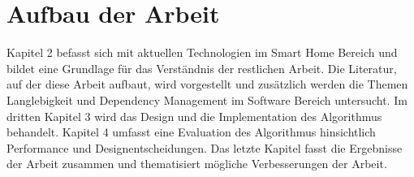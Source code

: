 \section{Aufbau der Arbeit}

Kapitel 2 befasst sich mit aktuellen Technologien im Smart Home Bereich und bildet eine Grundlage für das Verständnis der
restlichen Arbeit. Die Literatur, auf der diese Arbeit aufbaut, wird vorgestellt und zusätzlich werden die Themen Langlebigkeit
und Dependency Management im Software Bereich untersucht.
Im dritten Kapitel 3 wird das Design und die Implementation des Algorithmus behandelt.
Kapitel 4 umfasst eine Evaluation des Algorithmus hinsichtlich Performance und Designentscheidungen.
Das letzte Kapitel fasst die Ergebnisse der Arbeit zusammen und thematisiert mögliche Verbesserungen der Arbeit.


